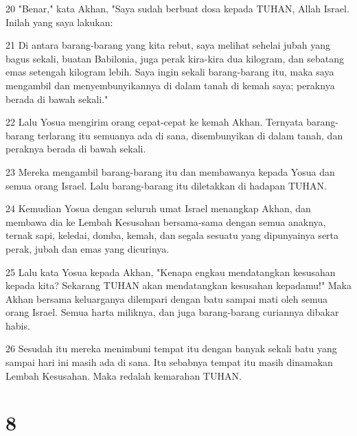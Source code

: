 \par 20 "Benar," kata Akhan, "Saya sudah berbuat dosa kepada TUHAN, Allah Israel. Inilah yang saya lakukan:
\par 21 Di antara barang-barang yang kita rebut, saya melihat sehelai jubah yang bagus sekali, buatan Babilonia, juga perak kira-kira dua kilogram, dan sebatang emas setengah kilogram lebih. Saya ingin sekali barang-barang itu, maka saya mengambil dan menyembunyikannya di dalam tanah di kemah saya; peraknya berada di bawah sekali."
\par 22 Lalu Yosua mengirim orang cepat-cepat ke kemah Akhan. Ternyata barang-barang terlarang itu semuanya ada di sana, disembunyikan di dalam tanah, dan peraknya berada di bawah sekali.
\par 23 Mereka mengambil barang-barang itu dan membawanya kepada Yosua dan semua orang Israel. Lalu barang-barang itu diletakkan di hadapan TUHAN.
\par 24 Kemudian Yosua dengan seluruh umat Israel menangkap Akhan, dan membawa dia ke Lembah Kesusahan bersama-sama dengan semua anaknya, ternak sapi, keledai, domba, kemah, dan segala sesuatu yang dipunyainya serta perak, jubah dan emas yang dicurinya.
\par 25 Lalu kata Yosua kepada Akhan, "Kenapa engkau mendatangkan kesusahan kepada kita? Sekarang TUHAN akan mendatangkan kesusahan kepadamu!" Maka Akhan bersama keluarganya dilempari dengan batu sampai mati oleh semua orang Israel. Semua harta miliknya, dan juga barang-barang curiannya dibakar habis.
\par 26 Sesudah itu mereka menimbuni tempat itu dengan banyak sekali batu yang sampai hari ini masih ada di sana. Itu sebabnya tempat itu masih dinamakan Lembah Kesusahan. Maka redalah kemarahan TUHAN.

\chapter{8}

